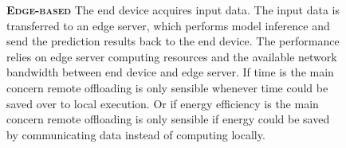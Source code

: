 \begin{figure}
\begin{minipage}{0.3\linewidth}
\begin{figure}
		\end{figure}
	\end{minipage}
	
	\begin{minipage}{0.3\linewidth}
		\centering
		\begin{figure}
			\centering
			\captionsetup[subfigure]{justification=centering}
		\end{figure}
	\end{minipage}
	\hfill
	\begin{minipage}{0.65\linewidth}
		\textbf{\protect{} \textsc{Edge-based}}
		\color{caption-color} \newline
		The end device acquires input data. The input data is transferred to an edge server, which performs model inference and send the prediction results back to the end device. The performance relies on edge server computing resources and the available network bandwidth between end device and edge server. If time is the main concern remote offloading is only sensible whenever time could be saved over to local execution. Or if energy efficiency is the main concern remote offloading is only sensible if energy could be saved by communicating data instead of computing locally.
	\end{minipage}
\end{figure}

